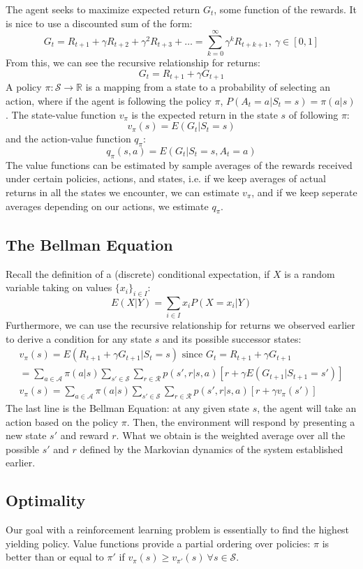 \documentclass[12pt, reqno]{article}
\theoremstyle{plain}    \newtheorem{theorem}{Theorem}[section]
\theoremstyle{plain}    \newtheorem{lemma}[theorem]{Lemma}
\theoremstyle{plain}    \newtheorem{claim}[theorem]{Claim}
\theoremstyle{plain}    \newtheorem{definition}{Definition}[section]
\theoremstyle{plain}    \newtheorem{proposition}[theorem]{Proposition}
\theoremstyle{plain}    \newtheorem{corollary}[theorem]{Corollary}
\theoremstyle{plain}    \newtheorem{example}[definition]{Example}
\newcommand{\RR}{\mathbb R}
\numberwithin{equation}{section}
\begin{document}
The agent seeks to maximize expected return \(G_t\), some function of the
rewards. It is nice to use a discounted sum of the form:
\[G_t = R_{t+1} + \gamma R_{t+2} + \gamma^2 R_{t+3} + \dots =
\sum_{k=0}^{\infty}\gamma^k R_{t+k+1}, \ \gamma \in [0,1]\]
From this, we can see the recursive relationship for returns:
\[G_t = R_{t+1} + \gamma G_{t+1}\]
A policy \(\pi: \mathcal{S} \to \RR\) is a mapping from a state to a
probability of selecting an action, where if the agent is following the policy
\(\pi\), \(P(A_t = a | S_t = s) = \pi(a|s)\). The state-value function \(v_{\pi}\) is
the expected return in the state \(s\) of following \(\pi\): 
\[v_{\pi}(s) = E(G_t | S_t = s)\]
and the action-value function \(q_{\pi}\):
\[q_{\pi}(s,a) = E(G_t | S_t = s, A_t = a)\]
The value functions can be estimated by sample averages of the rewards received
under certain policies, actions, and states, i.e. if we keep averages of actual
returns in all the states we encounter, we can estimate \(v_{\pi}\), and if we keep seperate
averages depending on our actions, we estimate \(q_{\pi}\).

\subsection{The Bellman Equation}
Recall the definition of a (discrete) conditional expectation, if \(X\) is a
random variable taking on values \(\{x_i\}_{i \in I}\):
\[E(X|Y) = \sum_{i \in I} x_i P(X=x_i | Y)\]
Furthermore, we can use the recursive relationship for returns we observed
earlier to derive a condition for any state \(s\) and its possible successor
states:
\begin{gather*}
	v_{\pi}(s) = E(R_{t+1} + \gamma G_{t+1}|S_t = s) \text{ since } G_t = R_{t+1} + \gamma G_{t+1} \\
	= \sum_{a \in \mathcal{A}}\pi(a|s) \sum_{s' \in \mathcal{S}} \sum_{r \in \mathcal{R}}p(s', r | s,a) \left[r + \gamma E(G_{t+1} | S_{t+1} = s') \right] \\
	\boxed{v_{\pi}(s) = \sum_{a \in \mathcal{A}}\pi(a|s) \sum_{s' \in \mathcal{S}} \sum_{r \in \mathcal{R}}p(s', r | s,a) [r + \gamma v_{\pi}(s')]}
\end{gather*}
The last line is the Bellman Equation: at any given state \(s\), the agent will
take an action based on the policy \(\pi\). Then, the environment will respond
by presenting a new state \(s'\) and reward \(r\). What we obtain is the
weighted average over all the possible \(s'\) and \(r\) defined by the Markovian
dynamics of the system established earlier.

\subsection{Optimality}

Our goal with a reinforcement learning problem is essentially to find the
highest yielding policy. Value functions provide a partial ordering over
policies: \(\pi\) is better than or equal to \(\pi'\) if \(v_{\pi}(s) \ge
v_{\pi'}(s) \ \forall s \in \mathcal{S}\).
\end{document}
